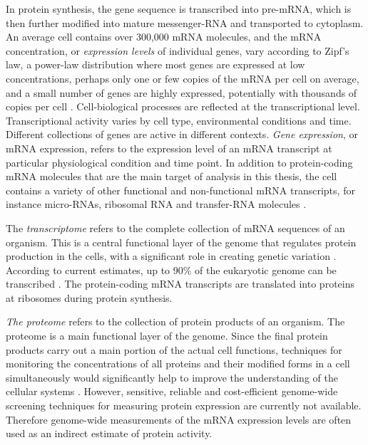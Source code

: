 In protein synthesis, the gene sequence is transcribed into pre-mRNA,
which is then further modified into mature messenger-RNA and
transported to cytoplasm. An average cell contains over 300,000 mRNA
molecules, and the mRNA concentration, or {\it expression levels} of
individual genes, vary according to Zipf's law, a power-law
distribution where most genes are expressed at low concentrations,
perhaps only one or few copies of the mRNA per cell on average, and a
small number of genes are highly expressed, potentially with thousands
of copies per cell \citep[see][]{Carninci2009, Furusawa2003}.
Cell-biological processes are reflected at the transcriptional
level. Transcriptional activity varies by cell type, environmental
conditions and time. Different collections of genes are active in
different contexts. {\it Gene expression}, or mRNA expression, refers
to the expression level of an mRNA transcript at particular
physiological condition and time point. In addition to protein-coding
mRNA molecules that are the main target of analysis in this thesis,
the cell contains a variety of other functional and non-functional
mRNA transcripts, for instance micro-RNAs, ribosomal RNA and
transfer-RNA molecules \citep{Carninci2009, Johnson05}.

The {\it transcriptome} refers to the complete collection of mRNA
sequences of an organism. This is a central functional layer of the
genome that regulates protein production in the cells, with a
significant role in creating genetic variation
\citep{Jordan05}. According to current estimates, up to 90\% of the
eukaryotic genome can be transcribed \citep{Carninci05, Gagneur2009}.
The protein-coding mRNA transcripts are translated into proteins at
ribosomes during protein synthesis. 

{\it The proteome} refers to the collection of protein products of an
organism. The proteome is a main functional layer of the genome. Since
the final protein products carry out a main portion of the actual cell
functions, techniques for monitoring the concentrations of all
proteins and their modified forms in a cell simultaneously would
significantly help to improve the understanding of the cellular
systems \citep{Collins03}. However, sensitive, reliable and
cost-efficient genome-wide screening techniques for measuring protein
expression are currently not available. Therefore genome-wide
measurements of the mRNA expression levels are often used as an
indirect estimate of protein activity.

